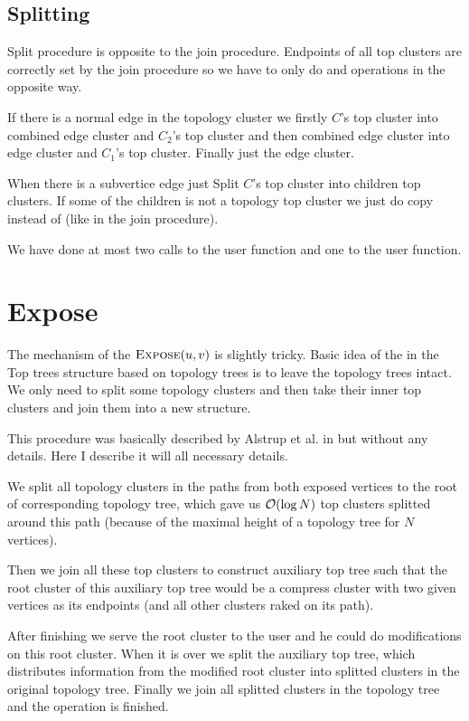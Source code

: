 \subsection{Splitting}

Split procedure is opposite to the join procedure. Endpoints of all top clusters
are correctly set by the join procedure so we have to only do \Split{} and
\Destroy{} operations in the opposite way.

If there is a normal edge in the topology cluster we firstly \Split{} $C$'s
{\I top cluster} into {\I combined edge cluster} and $C_2$'s {\I top cluster}
and then \Split{} {\I combined edge cluster} into {\I edge cluster} and $C_1$'s
{\I top cluster}. Finally just \Destroy{} the {\I edge cluster}.

When there is a subvertice edge just Split $C$'s {\I top cluster} into children
{\I top clusters}. If some of the children is not a topology top cluster we just
do copy instead of \Split{} (like in the join procedure).

We have done at most two calls to the \Split{} user function and one to the
\Create{} user function.


\section{Expose}

The mechanism of the $\hbox{\sc Expose}(u,v)$ is slightly tricky. Basic idea of the
\Expose{} in the Top trees structure based on topology trees is to leave the
topology trees intact. We only need to split some topology clusters and then
take their inner top clusters and join them into a new structure.

This procedure was basically described by Alstrup et al. in \cite{TopTrees} but
without any details. Here I describe it will all necessary details.

We split all topology clusters in the paths from both exposed vertices to the
root of corresponding topology tree, which gave us ${\cal O}(\log N)$ top clusters
splitted around this path (because of the maximal height of a topology tree for
$N$ vertices).

Then we join all these top clusters to construct {\I auxiliary top tree} such
that the root cluster of this auxiliary top tree would be a compress cluster
with two given vertices as its endpoints (and all other clusters raked on its
path).

After finishing \Expose{} we serve the root cluster to the user and he could do
modifications on this root cluster. When it is over we split the auxiliary top
tree, which distributes information from the modified root cluster into splitted
clusters in the original topology tree. Finally we join all splitted clusters
in the topology tree and the operation is finished.

